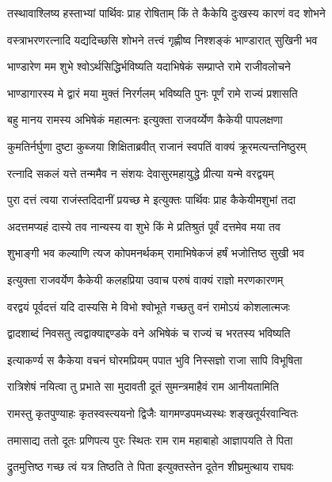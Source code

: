 \twolineshloka
{तस्थावाश्लिष्य हस्ताभ्यां पार्थिवः प्राह रोषिताम्}
{किं ते कैकेयि दुःखस्य कारणं वद शोभने} %

\twolineshloka
{वस्त्राभरणरत्नादि यद्यदिच्छसि शोभने}
{तत्त्वं गृह्णीष्व निश्शङ्कं भाण्डारात् सुखिनी भव} %

\twolineshloka
{भाण्डारेण मम शुभे श्वोऽर्थसिद्धिर्भविष्यति}
{यदाभिषेकं सम्प्राप्ते रामे राजीवलोचने} %

\twolineshloka
{भाण्डागारस्य मे द्वारं मया मुक्तं निरर्गलम्}
{भविष्यति पुनः पूर्णं रामे राज्यं प्रशासति} %

\twolineshloka
{बहु मानय रामस्य अभिषेकं महात्मनः}
{इत्युक्ता राजवर्य्येण कैकेयी पापलक्षणा} %

\twolineshloka
{कुमतिर्नर्घुणा दुष्टा कुब्जया शिक्षिताब्रवीत्}
{राजानं स्वपतिं वाक्यं क्रूरमत्यन्तनिष्ठुरम्} %

\twolineshloka
{रत्नादि सकलं यत्ते तन्ममैव न संशयः}
{देवासुरमहायुद्धे प्रीत्या यन्मे वरद्वयम्} %

\twolineshloka
{पुरा दत्तं त्वया राजंस्तदिदानीं प्रयच्छ मे}
{इत्युक्तः पार्थिवः प्राह कैकेयीमशुभां तदा} %

\twolineshloka
{अदत्तमप्यहं दास्ये तव नान्यस्य वा शुभे}
{किं मे प्रतिश्रुतं पूर्वं दत्तमेव मया तव} %

\twolineshloka
{शुभाङ्गी भव कल्याणि त्यज कोपमनर्थकम्}
{रामाभिषेकजं हर्षं भजोत्तिष्ठ सुखी भव} %

\twolineshloka
{इत्युक्ता राजवर्येण कैकेयी कलहप्रिया}
{उवाच परुषं वाक्यं राज्ञो मरणकारणम्} %

\twolineshloka
{वरद्वयं पूर्वदत्तं यदि दास्यसि मे विभो}
{श्वोभूते गच्छतु वनं रामोऽयं कोशलात्मजः} %

\twolineshloka
{द्वादशाब्दं निवसतु त्वद्वाक्याद्दण्डके वने}
{अभिषेकं च राज्यं च भरतस्य भविष्यति} %

\twolineshloka
{इत्याकर्ण्य स कैकेया वचनं घोरमप्रियम्}
{पपात भुवि निस्सज्ञो राजा सापि विभूषिता} %

\twolineshloka
{रात्रिशेषं नयित्वा तु प्रभाते सा मुदावती}
{दूतं सुमन्त्रमाहैवं राम आनीयतामिति} %

\twolineshloka
{रामस्तु कृतपुण्याहः कृतस्वस्त्ययनो द्विजैः}
{यागमण्डपमध्यस्थः शङ्खतूर्यरवान्वितः} %

\twolineshloka
{तमासाद्य ततो दूतः प्रणिपत्य पुरः स्थितः}
{राम राम महाबाहो आज्ञापयति ते पिता} %

\twolineshloka
{द्रुतमुत्तिष्ठ गच्छ त्वं यत्र तिष्ठति ते पिता}
{इत्युक्तस्तेन दूतेन शीघ्रमुत्थाय राघवः} %


